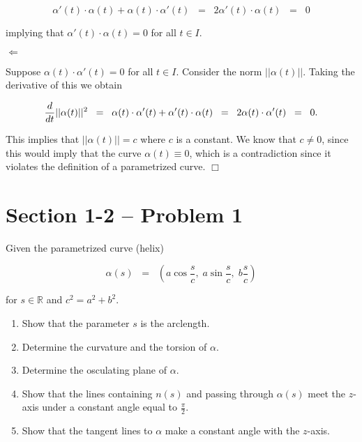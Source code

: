 \documentclass{article}
\begin{document}
\begin{equation*}
\alpha'(t) \cdot \alpha(t) + \alpha(t) \cdot \alpha'(t) \;\; = \;\; 2\alpha'(t)\cdot \alpha(t) \;\; = \;\; 0
\end{equation*}

\noindent implying that $\alpha'(t)\cdot \alpha(t) = 0$ for all $t \in I$. 

\vspace{1pc}

\noindent $\Longleftarrow$

\noindent Suppose $\alpha(t) \cdot \alpha'(t) = 0$ for all $t \in I$.  Consider the norm $||\alpha(t)||$.  Taking the derivative of this we obtain

\begin{equation*}
\frac{d}{dt} ||\alpha(t)||^2 \;\; = \;\; \alpha(t)\cdot \alpha'(t) + \alpha'(t)\cdot \alpha(t) \;\; = \;\; 2 \alpha(t) \cdot \alpha'(t) \;\; = \;\;0. \\
\end{equation*}

\noindent This implies that $||\alpha(t)|| = c$ where $c$ is a constant.  We know that $c \neq 0$, since this would imply that the curve $\alpha(t) \equiv 0$, which is a contradiction since it violates the definition of a parametrized curve.  \hfill $\Box$


\section*{Section 1-2 -- Problem 1}

\noindent Given the parametrized curve (helix)

\begin{equation*}
\alpha(s) \;\; = \;\; \left ( a \cos \frac{s}{c}, \; a \sin \frac{s}{c}, \; b \frac{s}{c} \right )
\end{equation*}

\noindent for $s \in \mathbb{R}$ and $c^2 = a^2 + b^2$.  

\begin{enumerate}
\item Show that the parameter $s$ is the arclength.
\item Determine the curvature and the torsion of $\alpha$.
\item Determine the osculating plane of $\alpha$.
\item Show that the lines containing $n(s)$ and passing through $\alpha(s)$ meet the $z$-axis under a constant angle equal to $\frac{\pi}{2}$.
\item Show that the tangent lines to $\alpha$ make a constant angle with the $z$-axis.  
\end{enumerate}
\end{document}
